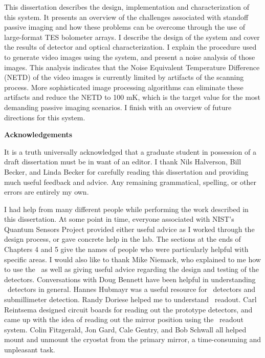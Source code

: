 \documentclass[12pt,letterpaper,openany]{memoir}
\numberwithin{equation}{chapter}
\numberwithin{figure}{chapter}
\numberwithin{table}{chapter}
\begin{document}
This dissertation describes the design, implementation and characterization of this system.
It presents an overview of the challenges associated with standoff passive imaging and how these problems can be overcome through the use of large-format TES bolometer arrays.
I describe the design of the system and cover the results of detector and optical characterization.
I explain the procedure used to generate video images using the system, and present a noise analysis of those images.
This analysis indicates that the Noise Equivalent Temperature Difference (NETD) of the video images is currently limited by artifacts of the scanning process.
More sophisticated image processing algorithms can eliminate these artifacts and reduce the NETD to 100 mK, which is the target value for the most demanding passive imaging scenarios.
I finish with an overview of future directions for this system.

\newpage
\begin{flushleft}\textbf{\Huge Acknowledgements}\end{flushleft}
\vspace{0.25in}

It is a truth universally acknowledged that a graduate student in possession of a draft dissertation must be in want of an editor.
I thank Nils Halverson, Bill Becker, and Linda Becker for carefully reading this dissertation and providing much useful feedback and advice.
Any remaining grammatical, spelling, or other errors are entirely my own.

I had help from many different people while performing the work described in this dissertation.
At some point in time, everyone associated with NIST's Quantum Sensors Project provided either useful advice as I worked through the design process, or gave concrete help in the lab.
The sections at the ends of Chapters 4 and 5 give the names of people who were particularly helpful with specific areas.
I would also like to thank Mike Niemack, who explained to me how to use the \MCE\ as well as giving useful advice regarding the design and testing of the detectors.
Conversations with Doug Bennett have been helpful in understanding \TES\ detectors in general.
Hannes Hubmayr was a useful resource for \TES\ detectors and submillimeter detection.
Randy Doriese helped me to understand \SQUID\ readout.
Carl Reintsema designed circuit boards for reading out the prototype detectors, and came up with the idea of reading out the mirror position using the \SQUID\ readout system.
Colin Fitzgerald, Jon Gard, Cale Gentry, and Bob Schwall all helped mount and unmount the cryostat from the primary mirror, a time-consuming and unpleasant task.
\end{document}
